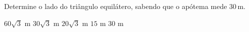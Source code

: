 \noindent\parbox{\linewidth}{

Determine o lado do triângulo equilátero, sabendo que o apótema mede $30$\,m.

$60\sqrt{3}$ m
$30\sqrt{3}$ m
$20\sqrt{3}$ m
$15$ m
$30$ m



}



